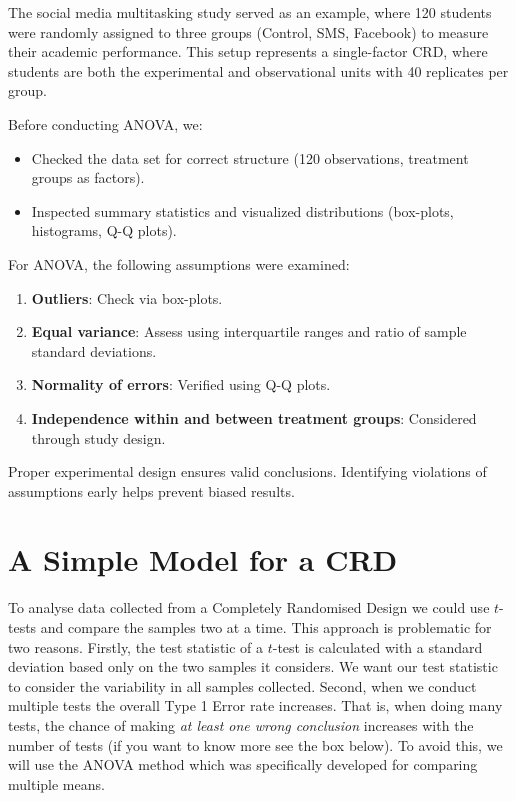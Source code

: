 \documentclass[
  letterpaper,
]{book}
\providecommand{\tightlist}{%
  \setlength{\itemsep}{0pt}\setlength{\parskip}{0pt}}\usepackage{longtable,booktabs,array}
\begin{document}
The social media multitasking study served as an example, where 120
students were randomly assigned to three groups (Control, SMS, Facebook)
to measure their academic performance. This setup represents a
single-factor CRD, where students are both the experimental and
observational units with 40 replicates per group.

Before conducting ANOVA, we:

\begin{itemize}
\tightlist
\item
  Checked the data set for correct structure (120 observations,
  treatment groups as factors).
\item
  Inspected summary statistics and visualized distributions (box-plots,
  histograms, Q-Q plots).
\end{itemize}

For ANOVA, the following assumptions were examined:

\begin{enumerate}
\def\labelenumi{\arabic{enumi}.}
\tightlist
\item
  \textbf{Outliers}: Check via box-plots.
\item
  \textbf{Equal variance}: Assess using interquartile ranges and ratio
  of sample standard deviations.
\item
  \textbf{Normality of errors}: Verified using Q-Q plots.
\item
  \textbf{Independence within and between treatment groups}: Considered
  through study design.
\end{enumerate}

Proper experimental design ensures valid conclusions. Identifying
violations of assumptions early helps prevent biased results.

\chapter{A Simple Model for a CRD}\label{a-simple-model-for-a-crd}

To analyse data collected from a Completely Randomised Design we could
use \(t\)-tests and compare the samples two at a time. This approach is
problematic for two reasons. Firstly, the test statistic of a \(t\)-test
is calculated with a standard deviation based only on the two samples it
considers. We want our test statistic to consider the variability in all
samples collected. Second, when we conduct multiple tests the overall
Type 1 Error rate increases. That is, when doing many tests, the chance
of making \emph{at least one wrong conclusion} increases with the number
of tests (if you want to know more see the box below). To avoid this, we
will use the ANOVA method which was specifically developed for comparing
multiple means.
\end{document}
